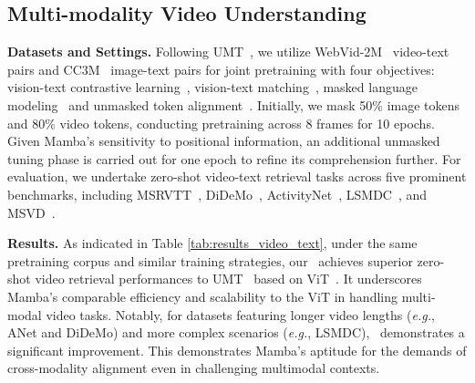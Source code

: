 \subsection{Multi-modality Video Understanding}

\noindent\textbf{Datasets and Settings.} 
Following UMT~\cite{umt},
we utilize WebVid-2M~\cite{bain2021frozen} video-text pairs and CC3M~\cite{cc3m} image-text pairs for joint pretraining with four objectives:
vision-text contrastive learning~\cite{bain2021frozen},
vision-text matching~\cite{li2021align},
masked language modeling~\cite{devlin2018bert} and unmasked token alignment~\cite{umt}.
Initially, 
we mask 50\% image tokens and 80\% video tokens, 
conducting pretraining across 8 frames for 10 epochs. 
Given Mamba's sensitivity to positional information, 
an additional unmasked tuning phase is carried out for one epoch to refine its comprehension further.
For evaluation,
we undertake zero-shot video-text retrieval tasks across five prominent benchmarks, 
including MSRVTT~\cite{msrvtt}, DiDeMo~\cite{didemo}, ActivityNet~\cite{activitynet}, LSMDC~\cite{lsmdc}, and MSVD~\cite{msvd}.
 


\vspace{0.05cm}
\noindent\textbf{Results.} 
As indicated in Table \ref{tab:results_video_text}, 
under the same pretraining corpus and similar training strategies, 
our \ModelName\  achieves superior zero-shot video retrieval performances to UMT~\cite{umt} based on ViT~\cite{vit}.
It underscores Mamba's comparable efficiency and scalability to the ViT in handling multi-modal video tasks.
Notably, 
for datasets featuring longer video lengths (\textit{e.g.}, ANet and DiDeMo) and more complex scenarios (\textit{e.g.}, LSMDC), 
\ModelName\  demonstrates a significant improvement. 
This demonstrates Mamba's aptitude for the demands of cross-modality alignment even in challenging multimodal contexts.
